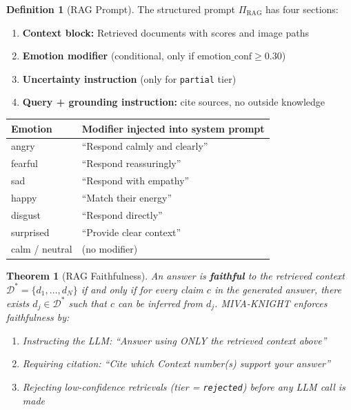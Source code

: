\documentclass[12pt,a4paper]{article}
\theoremstyle{definition}
\newtheorem{definition}{Definition}[section]
\theoremstyle{plain}
\newtheorem{theorem}{Theorem}[section]
\theoremstyle{remark}
\begin{document}
\begin{definition}[RAG Prompt]
The structured prompt $\Pi_{\text{RAG}}$ has four sections:
\begin{enumerate}
  \item \textbf{Context block:} Retrieved documents with scores and image paths
  \item \textbf{Emotion modifier} (conditional, only if $\text{emotion\_conf} \ge 0.30$)
  \item \textbf{Uncertainty instruction} (only for \texttt{partial} tier)
  \item \textbf{Query + grounding instruction:} cite sources, no outside knowledge
\end{enumerate}
\end{definition}

\begin{tcolorbox}[keybox, title=Emotion Modifier Table]
\begin{tabular}{ll}
\toprule
Emotion & Modifier injected into system prompt \\
\midrule
angry    & ``Respond calmly and clearly'' \\
fearful  & ``Respond reassuringly'' \\
sad      & ``Respond with empathy'' \\
happy    & ``Match their energy'' \\
disgust  & ``Respond directly'' \\
surprised & ``Provide clear context'' \\
calm / neutral & (no modifier) \\
\bottomrule
\end{tabular}
\end{tcolorbox}

\begin{theorem}[RAG Faithfulness]
\label{thm:rag}
An answer is \textbf{faithful} to the retrieved context $\mathcal{D}^* = \{d_1,\ldots,d_N\}$
if and only if for every claim $c$ in the generated answer, there exists $d_j \in \mathcal{D}^*$
such that $c$ can be inferred from $d_j$. MIVA-KNIGHT enforces faithfulness by:
\begin{enumerate}
  \item Instructing the LLM: ``Answer using ONLY the retrieved context above''
  \item Requiring citation: ``Cite which Context number(s) support your answer''
  \item Rejecting low-confidence retrievals (tier = \texttt{rejected}) before any
    LLM call is made
\end{enumerate}
\end{theorem}
\end{document}
